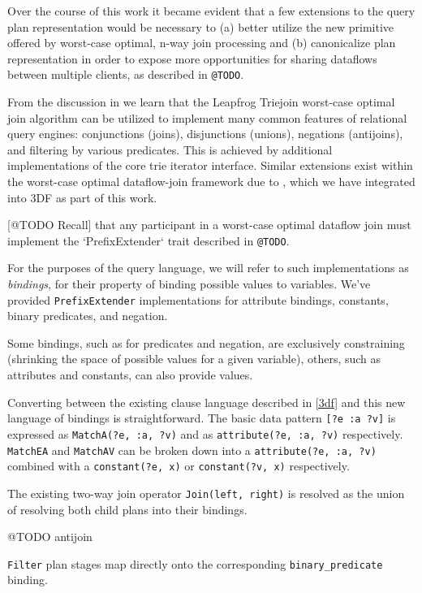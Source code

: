 \documentclass[../index.tex]{subfiles}
\begin{document}
Over the course of this work it became evident that a few extensions
to the query plan representation would be necessary to (a) better
utilize the new primitive offered by worst-case optimal, n-way join
processing and (b) canonicalize plan representation in order to expose
more opportunities for sharing dataflows between multiple clients, as
described in \texttt{@TODO}.

From the discussion in \cite{veldhuizen2012leapfrog} we learn that the
Leapfrog Triejoin worst-case optimal join algorithm can be utilized to
implement many common features of relational query engines:
conjunctions (joins), disjunctions (unions), negations (antijoins),
and filtering by various predicates. This is achieved by additional
implementations of the core trie iterator interface. Similar
extensions exist within the worst-case optimal dataflow-join framework
due to \cite{ammar2018distributed}, which we have integrated into 3DF
as part of this work.

[@TODO Recall] that any participant in a worst-case optimal dataflow
join must implement the `PrefixExtender` trait described in
\texttt{@TODO}.

For the purposes of the query language, we will refer to such
implementations as \emph{bindings}, for their property of binding
possible values to variables. We've provided \texttt{PrefixExtender}
implementations for attribute bindings, constants, binary predicates,
and negation.

Some bindings, such as for predicates and negation, are exclusively
constraining (shrinking the space of possible values for a given
variable), others, such as attributes and constants, can also provide
values.

Converting between the existing clause language described in \ref{3df}
and this new language of bindings is straightforward. The basic data
pattern \texttt{[?e :a ?v]} is expressed as \texttt{MatchA(?e, :a,
  ?v)} and as \texttt{attribute(?e, :a, ?v)}
respectively. \texttt{MatchEA} and \texttt{MatchAV} can be broken down
into a \texttt{attribute(?e, :a, ?v)} combined with a
\texttt{constant(?e, x)} or \texttt{constant(?v, x)} respectively.

The existing two-way join operator \texttt{Join(left, right)} is
resolved as the union of resolving both child plans into their
bindings.

@TODO antijoin

\texttt{Filter} plan stages map directly onto the corresponding
\texttt{binary\_predicate} binding.
\end{document}
